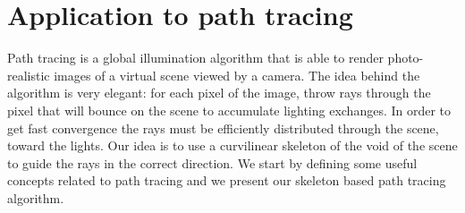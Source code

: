 \section{Application to path tracing}

Path tracing is a global illumination algorithm that is able to render photo-realistic images of a virtual scene viewed by a camera. The idea behind the algorithm is very elegant: for each pixel of the image, throw rays through the pixel that will bounce on the scene to accumulate lighting exchanges. In order to get fast convergence the rays must be efficiently distributed through the scene, toward the lights. Our idea is to use a curvilinear skeleton of the void of the scene to guide the rays in the correct direction. We start by defining some useful concepts related to path tracing and we present our skeleton based path tracing algorithm.

